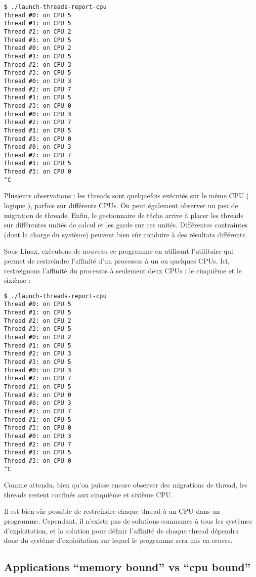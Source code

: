 \documentclass[fleqn,11pt]{article}
\begin{document}
\begin{verbatim}
$ ./launch-threads-report-cpu
Thread #0: on CPU 5
Thread #1: on CPU 5
Thread #2: on CPU 2
Thread #3: on CPU 5
Thread #0: on CPU 2
Thread #1: on CPU 5
Thread #2: on CPU 3
Thread #3: on CPU 5
Thread #0: on CPU 3
Thread #2: on CPU 7
Thread #1: on CPU 5
Thread #3: on CPU 0
Thread #0: on CPU 3
Thread #2: on CPU 7
Thread #1: on CPU 5
Thread #3: on CPU 0
Thread #0: on CPU 3
Thread #2: on CPU 7
Thread #1: on CPU 5
Thread #3: on CPU 0
^C 
\end{verbatim}

\underline{Plusieurs observations} : les threads sont quelquefois exécutés sur le même CPU ( logique ), parfois
sur différents CPUs. On peut également observer un peu de migration de threads. Enfin, le gestionnaire de tâche
arrive à placer les threads sur différentes unités de calcul et les garde sur ces unités. Différentes contraintes
(dont la charge du système) peuvent bien sûr conduire à des résultats différents.

Sous Linux, exécutons de nouveau ce programme en utilisant l'utilitaire \lstinline@taskset@ qui permet de restreindre
l'affinité d'un processus à un ou quelques CPUs. Ici, restreignons l'affinité du processus à seulement deux CPUs : le
cinquième et le sixième :

\begin{verbatim}
$ ./launch-threads-report-cpu
Thread #0: on CPU 5
Thread #1: on CPU 5
Thread #2: on CPU 2
Thread #3: on CPU 5
Thread #0: on CPU 2
Thread #1: on CPU 5
Thread #2: on CPU 3
Thread #3: on CPU 5
Thread #0: on CPU 3
Thread #2: on CPU 7
Thread #1: on CPU 5
Thread #3: on CPU 0
Thread #0: on CPU 3
Thread #2: on CPU 7
Thread #1: on CPU 5
Thread #3: on CPU 0
Thread #0: on CPU 3
Thread #2: on CPU 7
Thread #1: on CPU 5
Thread #3: on CPU 0
^C
\end{verbatim}

Comme attendu, bien qu'on puisse encore observer des migrations de thread, les threads restent confinés aux
cinquième et sixième CPU.

Il est bien sûr possible de restreindre chaque thread à un CPU dans un programme. Cependant, il n'existe pas de solutions
communes à tous les systèmes d'exploitation, et la solution pour définir l'affinité de chaque thread dépendra donc du
système d'exploitation sur lequel le programme sera mis en {\oe}uvre.

\subsection{Applications ``memory bound'' vs ``cpu bound''}
\end{document}
